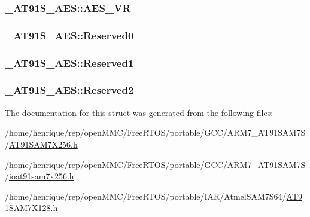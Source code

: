 \hypertarget{struct__AT91S__AES_aea9595f146dbffd775f26808eefb9bfe}{
\subsubsection[{A\-E\-S\-\_\-\-V\-R}]{ \-\_\-\-A\-T91\-S\-\_\-\-A\-E\-S\-::\-A\-E\-S\-\_\-\-V\-R}}\label{struct__AT91S__AES_aea9595f146dbffd775f26808eefb9bfe}
\hypertarget{struct__AT91S__AES_addafe86fd384f01d4ce0701147b9bf50}{
\subsubsection[{Reserved0}]{ \-\_\-\-A\-T91\-S\-\_\-\-A\-E\-S\-::\-Reserved0}}\label{struct__AT91S__AES_addafe86fd384f01d4ce0701147b9bf50}
\hypertarget{struct__AT91S__AES_a01d2116ba906139dcec1948ef9b9d0e6}{
\subsubsection[{Reserved1}]{ \-\_\-\-A\-T91\-S\-\_\-\-A\-E\-S\-::\-Reserved1}}\label{struct__AT91S__AES_a01d2116ba906139dcec1948ef9b9d0e6}
\hypertarget{struct__AT91S__AES_a382932515ba4318badc915bb00fe8b14}{
\subsubsection[{Reserved2}]{ \-\_\-\-A\-T91\-S\-\_\-\-A\-E\-S\-::\-Reserved2}}\label{struct__AT91S__AES_a382932515ba4318badc915bb00fe8b14}


The documentation for this struct was generated from the following files\-:\begin{DoxyCompactItemize}
\item 
/home/henrique/rep/open\-M\-M\-C/\-Free\-R\-T\-O\-S/portable/\-G\-C\-C/\-A\-R\-M7\-\_\-\-A\-T91\-S\-A\-M7\-S/\hyperlink{GCC_2ARM7__AT91SAM7S_2AT91SAM7X256_8h}{A\-T91\-S\-A\-M7\-X256.\-h}\item 
/home/henrique/rep/open\-M\-M\-C/\-Free\-R\-T\-O\-S/portable/\-G\-C\-C/\-A\-R\-M7\-\_\-\-A\-T91\-S\-A\-M7\-S/\hyperlink{ioat91sam7x256_8h}{ioat91sam7x256.\-h}\item 
/home/henrique/rep/open\-M\-M\-C/\-Free\-R\-T\-O\-S/portable/\-I\-A\-R/\-Atmel\-S\-A\-M7\-S64/\hyperlink{AT91SAM7X128_8h}{A\-T91\-S\-A\-M7\-X128.\-h}\end{DoxyCompactItemize}
